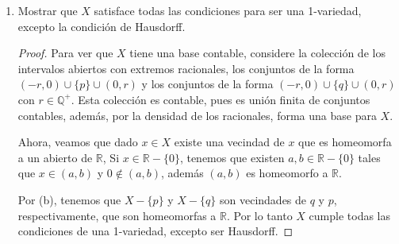 \begin{enumerate}
\begin{proof}
            Para ver que $X$ no es Hausdorff, tome $p$ y $q$ y sean $U_p$, $U_q$ vecindades de $p$ y $q$ respectivamente, tales que $q \neq U_p$ y $p \neq U_q$. Ya que $U_p$ es abierto, existe $(-a,0)\cup {p} \cup (0,a) \subseteq U_p$ para algún $a>0$, de manera análoga existe $(-b,0)\cup \{q\} \cup (0,b) \subseteq U_q$ con $b>0$, ahora tome $c=\min\{a,b\}$, note que $(-c,0)\cup (0,c) \subseteq U_p \cap U_q$, luego $X$ no puede ser Hausdorff. 
         \end{proof}
        \item Mostrar que \( X \) satisface todas las condiciones para ser una 1-variedad, excepto la condición de Hausdorff.
        \begin{proof}
            Para ver que $X$ tiene una base contable, considere la colección de los intervalos abiertos con extremos racionales, los conjuntos de la forma $(-r,0)\cup \{p\} \cup (0,r)$ y los conjuntos de la forma $(-r,0) \cup \{q\} \cup (0,r)$ con $r \in \mathbb{Q}^+$. Esta colección es contable, pues es unión finita de conjuntos contables, además, por la densidad de los racionales, forma una base para $X$.

            Ahora, veamos que dado $x \in X$ existe una vecindad de $x$ que es homeomorfa a un abierto de $\mathbb{R}$, Si $x \in \mathbb{R}-\{0\}$, tenemos que existen $a,b \in \mathbb{R}-\{0\}$ tales que $x \in 
            (a,b)$ y $0 \notin (a,b)$, además $(a,b)$ es homeomorfo a $\mathbb{R}$.

            Por (b), tenemos que $X-\{p\}$ y $X-\{q\}$ son vecindades de $q$ y $p$, respectivamente, que son homeomorfas a $\mathbb{R}$. Por lo tanto $X$ cumple todas las condiciones de una 1-variedad, excepto ser Hausdorff.
        \end{proof}
    \end{enumerate}